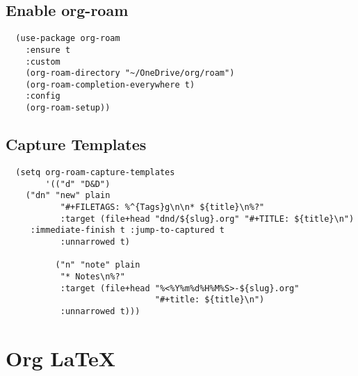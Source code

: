 \documentclass[11pt]{article}
\begin{document}
\subsection{Enable org-roam}
\label{sec:orgfe84968}
\begin{verbatim}
  (use-package org-roam
    :ensure t
    :custom
    (org-roam-directory "~/OneDrive/org/roam")
    (org-roam-completion-everywhere t)
    :config
    (org-roam-setup))
\end{verbatim}
\subsection{Capture Templates}
\label{sec:orgde6b3b5}
\begin{verbatim}
  (setq org-roam-capture-templates
        '(("d" "D&D")
  	("dn" "new" plain
           "#+FILETAGS: %^{Tags}g\n\n* ${title}\n%?"
           :target (file+head "dnd/${slug}.org" "#+TITLE: ${title}\n")
  	 :immediate-finish t :jump-to-captured t
           :unnarrowed t)

          ("n" "note" plain
           "* Notes\n%?"
           :target (file+head "%<%Y%m%d%H%M%S>-${slug}.org"
                              "#+title: ${title}\n")
           :unnarrowed t)))
\end{verbatim}
\section{Org \LaTeX{}}
\label{sec:orgf605e9e}
\end{document}
